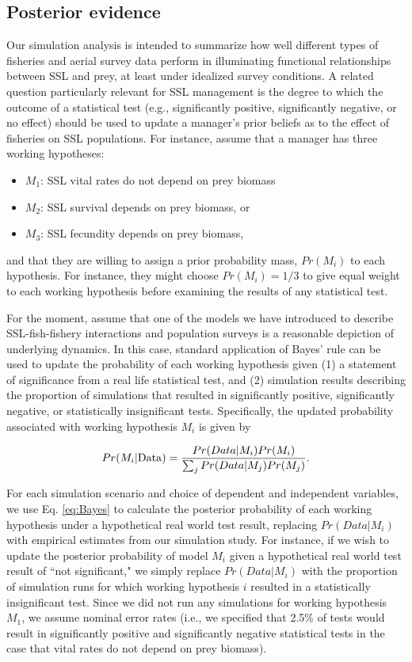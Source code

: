 \documentclass[nonumbib,leqno]{nrc1}
\begin{document}
\subsection{Posterior evidence}

Our simulation analysis is intended to summarize how well different types of fisheries and aerial survey data perform in illuminating functional relationships between SSL and prey, at least under idealized survey conditions.  A related question particularly relevant for SSL management is the degree to which the outcome of a statistical test (e.g., significantly positive, significantly negative, or no effect) should be used to update a manager's prior beliefs as to the effect of fisheries on SSL populations.  For instance, assume that a manager has three working hypotheses: 
\begin{itemize}
\item $M_1$: SSL vital rates do not depend on prey biomass
\item $M_2$: SSL survival depends on prey biomass, or
\item $M_3$: SSL fecundity depends on prey biomass,
\end{itemize}
and that they are willing to assign a prior probability mass, $Pr(M_i)$ to each hypothesis.  For instance, 
they might choose $Pr(M_i)=1/3$ to give equal weight to each working hypothesis before examining the results of any statistical test.

For the moment, assume that one of the models we have introduced to describe SSL-fish-fishery interactions and population surveys is a reasonable depiction of underlying dynamics.  In this case, standard application of Bayes' rule can be used to update the probability of each working hypothesis given (1) a statement of significance from a real life statistical test, and (2) simulation results describing the proportion of simulations that resulted in significantly positive, significantly negative, or statistically insignificant tests.  Specifically, the updated probability associated with working hypothesis $M_i$ is given by
\begin{linenomath}
  \begin{equation}
     \label{eq:Bayes}
     Pr(M_i | {\rm Data}) = \frac{Pr(Data|M_i)Pr(M_i)}{\sum_j Pr(Data|M_j)Pr(M_j)}.
  \end{equation}
\end{linenomath}
For each simulation scenario and choice of dependent and independent variables, we use Eq. \ref{eq:Bayes} to calculate the posterior probability of each working hypothesis under a hypothetical real world test result, replacing $Pr(Data|M_i)$ with empirical estimates from our simulation study.  For instance, if we wish to update the posterior probability of model $M_i$ given a hypothetical real world test result of ``not significant," we simply replace $Pr(Data|M_i)$ with the proportion of simulation runs for which working hypothesis $i$ resulted in a statistically insignificant test.  Since we did not run any simulations for working hypothesis $M_1$, we assume nominal error rates (i.e., we specified that 2.5\% of tests would result in significantly positive and significantly negative statistical tests in the case that vital rates do not depend on prey biomass).
\end{document}
